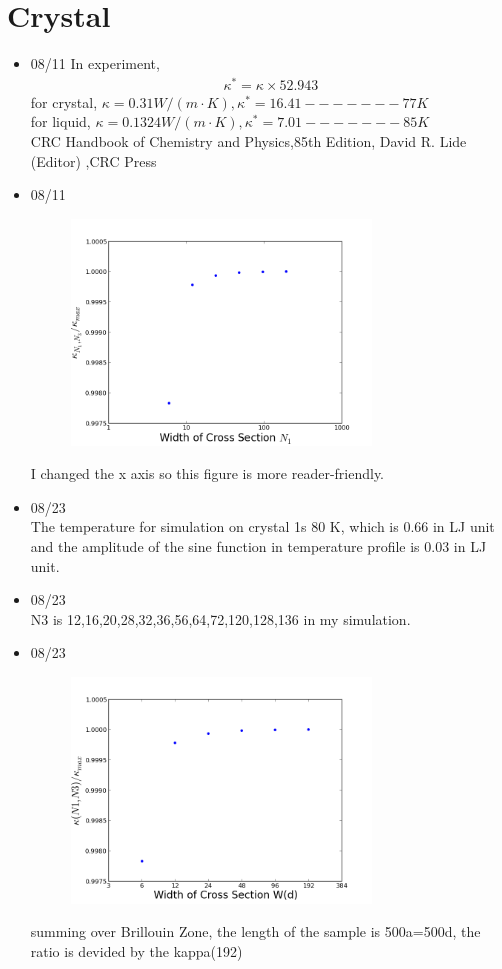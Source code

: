 \documentclass{article}
\begin{document}
\section*{Crystal}
\begin{itemize}

\item \mbox{08/11}
In experiment, 
\begin{align*}
\kappa^*=\kappa\times 52.943
\end{align*}
for crystal, $\kappa=0.31 W/(m\cdot K), \kappa^*=16.41------- 77K$\\
for liquid, $\kappa=0.1324 W/(m\cdot K), \kappa^*=7.01------- 85K$\\
CRC Handbook of Chemistry and Physics,85th Edition,	David R. Lide (Editor) ,CRC Press
\item \mbox{08/11}\\
\begin{figure}[h]
    \includegraphics[height=6cm]{Cross5.png}
\end{figure}
I changed the x axis so this figure is more reader-friendly.

\item {08/23}\\
  The temperature for simulation on crystal 1s 80 K, which is 0.66 in LJ unit and the amplitude of the sine function in temperature profile is 0.03 in LJ unit.  
\item {08/23}\\
  N3 is 12,16,20,28,32,36,56,64,72,120,128,136 in my simulation.
  \item \mbox{08/23}\\
\begin{figure}[h]
    \includegraphics[height=6cm]{Cross3.png}
\end{figure}
summing over Brillouin Zone, the length of the sample is 500a=500d, the ratio is devided by the kappa(192)
\end{itemize}
\end{document}
